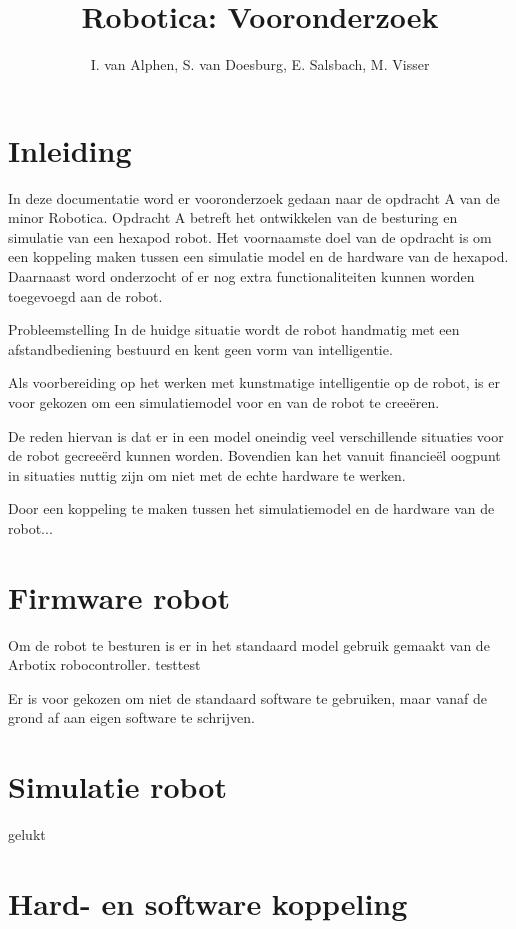 \documentclass[10pt,a4paper]{article}
\title{Robotica: Vooronderzoek}
\author{I. van Alphen, S. van Doesburg, E.  Salsbach, M. Visser}
\begin{document}
\maketitle

\section{Inleiding}
In deze documentatie word er vooronderzoek gedaan naar de opdracht A van de minor Robotica. Opdracht A betreft het ontwikkelen van de besturing en simulatie van een hexapod robot. Het voornaamste doel van de opdracht is om een koppeling maken tussen een simulatie model en de hardware van de hexapod. Daarnaast word onderzocht of er nog extra functionaliteiten kunnen worden toegevoegd aan de robot.

Probleemstelling
In de huidge situatie wordt de robot handmatig met een afstandbediening bestuurd en kent geen vorm van intelligentie. 

Als voorbereiding op het werken met kunstmatige intelligentie op de robot, is er voor gekozen om een simulatiemodel voor en van de robot te cree\"eren. 

De reden hiervan is dat er in een model oneindig veel verschillende situaties voor de robot gecree\"erd kunnen worden. Bovendien kan het vanuit financie\"el oogpunt in situaties nuttig zijn om niet met de echte hardware te werken. 

Door een koppeling te maken tussen het simulatiemodel en de hardware van de robot...




\section{Firmware robot}
Om de robot te besturen is er in het standaard model gebruik gemaakt van de Arbotix robocontroller. 
testtest

Er is voor gekozen om niet de standaard software te gebruiken, maar vanaf de grond af aan eigen software te schrijven.

\section{Simulatie robot}
gelukt

\section{Hard- en software koppeling}
\end{document}
